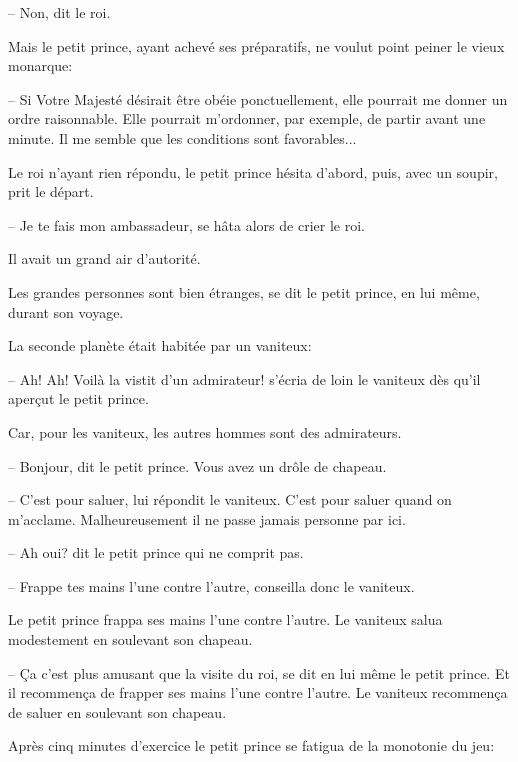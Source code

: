 \documentclass[a4paper]{report}
\begin{document}
-- Non, dit le roi.

Mais le petit prince, ayant achevé ses préparatifs, ne voulut point peiner le vieux monarque:

-- Si Votre Majesté désirait être obéie ponctuellement, elle pourrait me donner un ordre raisonnable. Elle pourrait m'ordonner, par exemple, de partir avant une minute. Il me semble que les conditions sont favorables...

Le roi n'ayant rien répondu, le petit prince hésita d'abord, puis, avec un soupir, prit le départ.

-- Je te fais mon ambassadeur, se hâta alors de crier le roi.

Il avait un grand air d'autorité.

Les grandes personnes sont bien étranges, se dit le petit prince, en lui même, durant son voyage.

\parachapter{} %

La seconde planète était habitée par un vaniteux:

-- Ah! Ah! Voilà la vistit d'un admirateur! s'écria de loin le vaniteux dès qu'il aperçut le petit prince. 


Car, pour les vaniteux, les autres hommes sont des admirateurs.

-- Bonjour, dit le petit prince. Vous avez un drôle de chapeau.

-- C'est pour saluer, lui répondit le vaniteux. C'est pour saluer quand on m'acclame. Malheureusement il ne passe jamais personne par ici.

-- Ah oui? dit le petit prince qui ne comprit pas.

-- Frappe tes mains l'une contre l'autre, conseilla donc le vaniteux.

Le petit prince frappa ses mains l'une contre l'autre. Le vaniteux salua modestement en soulevant son chapeau.

-- Ça c'est plus amusant que la visite du roi, se dit en lui même le petit prince. Et il recommença de frapper ses mains l'une contre l'autre. Le vaniteux recommença de saluer en soulevant son chapeau.

Après cinq minutes d'exercice le petit prince se fatigua de la monotonie du jeu:
\end{document}
